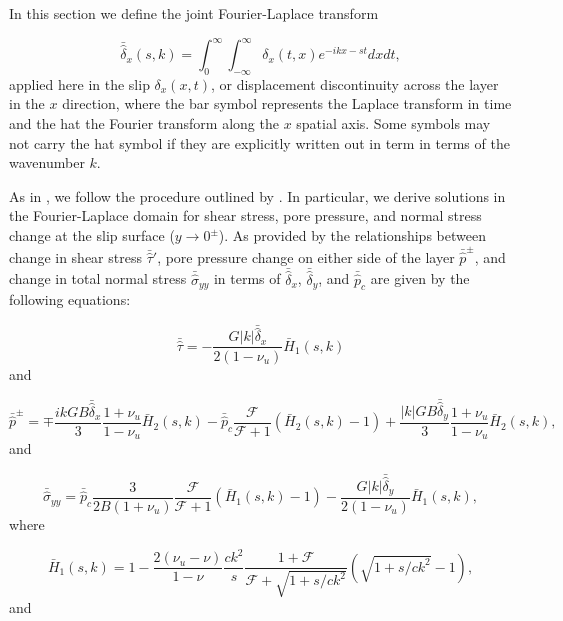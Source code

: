 \documentclass[draft]{agujournal2019}
\begin{document}
In this section we define the joint Fourier-Laplace transform 

\begin{equation}
\bar{\hat{\delta}}_x(s,k) = \int_{0}^{\infty} \int_{-\infty}^{\infty} \delta_x(t,x)
e^{-ikx-st} dx dt ,
\label{eq:LF}
\end{equation}
applied here in the slip $\delta_x(x,t)$, or displacement discontinuity across the layer in the $x$ direction, where the bar symbol represents the Laplace transform in time and the hat the Fourier transform along the $x$ spatial axis. Some symbols may not carry the hat symbol if they are explicitly written out in term in terms of the wavenumber $k$.
	
As in , we follow the procedure outlined by . In particular, we derive solutions in the Fourier-Laplace domain for shear stress, pore pressure, and normal stress change at the slip surface ($y \rightarrow 0^\pm$). As provided by  the relationships between change in shear stress $\bar{\hat{\tau}}'$, pore pressure change on either side of the layer $\bar{\hat{p}}^\pm$, and change in total normal stress $\bar{\hat{\sigma}}_{yy}$ in terms of $\bar{\hat{\delta}}_x$, $\bar{\hat{\delta}}_y$, and $\bar{\hat{p}}_c$ are given by the following equations:
	
\begin{equation}
\bar{\hat{\tau}} = -  \frac{G |k| \bar{\hat{\delta}}_x}{2(1-\nu_u)} \bar{H}_1(s,k)
\label{eq:tau}
\end{equation}
and

\begin{equation}
\bar{\hat{p}}^\pm = \mp \frac{ik G B \bar{\hat{\delta}}_x}{3} \frac{1+\nu_u}{1-\nu_u} \bar{H}_2(s,k) -  \bar{\hat{p}}_c \frac{\mathcal{F}}{\mathcal{F} + 1} \left( \bar{H}_2(s,k) - 1 \right) + \frac{|k| G B \bar{\hat{\delta}}_y}{3} \frac{1+\nu_u}{1-\nu_u} \bar{H}_2(s,k) ,
\label{eq:p}
\end{equation}
and

\begin{equation}
\bar{\hat{\sigma}}_{yy} = \bar{\hat{p}}_c \frac{3 }{2 B (1 + \nu_u)} \frac{ \mathcal{F} }{\mathcal{F} + 1} (\bar{H}_1(s,k) - 1) - \frac{G |k| \bar{\hat{\delta}}_y}{2(1-\nu_u)} \bar{H}_1(s,k),
\label{eq:sigyy}
\end{equation}
where

\begin{equation}
\bar{H}_1(s,k) = 1 - \frac{2(\nu_u - \nu)}{1-\nu} \frac{c k^2}{s} \frac{1 + \mathcal{F}}{\mathcal{F} + \sqrt{1+s/c k^2}}\left( \sqrt{1+s/c k^2} - 1 \right),
\label{eq:H1}
\end{equation}
and
\end{document}
